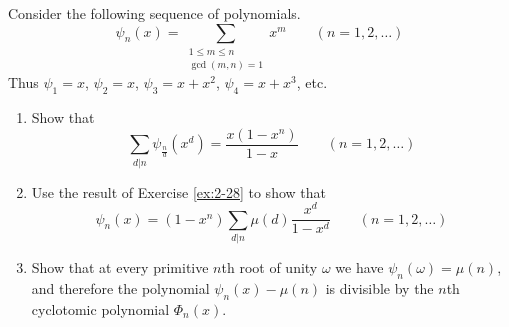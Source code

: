 \begin{exercise}
    Consider the following sequence of polynomials.
    \[
        \psi_n(x) = \sum_{\substack{1\leq m\leq n\\\gcd(m,n)=1}} x^m \qquad (n=1,2,\ldots)
    \]
    Thus $\psi_1 =x$, $\psi_2=x$, $\psi_3=x+x^2$, $\psi_4=x+x^3$, etc.
    \begin{enumerate}[label=(\alph*)]
        \item Show that 
        \[
            \sum_{d\vert n} \psi_{\frac{n}{d}}(x^d) = \frac{x(1-x^n)}{1-x} \qquad (n=1,2,\ldots)
        \]
        \item Use the result of Exercise \ref{ex:2-28} to show that 
        \[
            \psi_n(x) = (1-x^n) \sum_{d\vert n}\mu(d) \frac{x^d}{1-x^d} \qquad (n=1,2,\ldots)
        \]
        \item Show that at every primitive $n$th root of unity $\omega$ we have $\psi_n(\omega) = \mu(n)$, and therefore the polynomial $\psi_n(x)-\mu(n)$ is divisible by the $n$th cyclotomic polynomial $\Phi_n(x)$.
    \end{enumerate}
\end{exercise}

